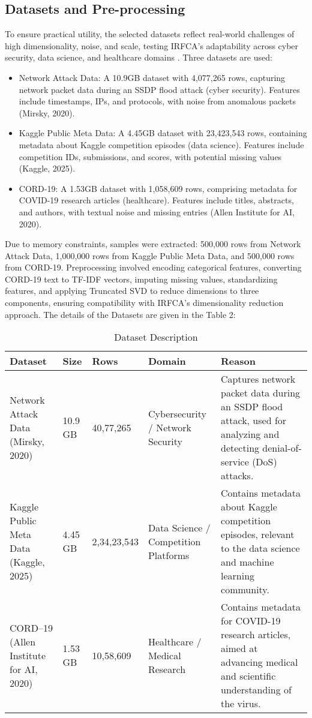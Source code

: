 \documentclass[twoside,11pt]{article}
\renewcommand{\cite}{\citep}
\begin{document}
\subsection{Datasets and Pre-processing}
To ensure practical utility, the selected datasets reflect real-world challenges of high dimensionality, noise, and scale, testing IRFCA’s adaptability across cyber security, data science, and healthcare domains \cite{jain1988,kaufman1990}. Three datasets are used:
\begin{itemize}[nosep]
    \item Network Attack Data: A 10.9GB dataset with 4,077,265 rows, capturing network packet data during an SSDP flood attack (cyber security). Features include timestamps, IPs, and protocols, with noise from anomalous packets (Mirsky, 2020).
    \item Kaggle Public Meta Data: A 4.45GB dataset with 23,423,543 rows, containing metadata about Kaggle competition episodes (data science). Features include competition IDs, submissions, and scores, with potential missing values (Kaggle, 2025).
    \item CORD-19: A 1.53GB dataset with 1,058,609 rows, comprising metadata for COVID-19 research articles (healthcare). Features include titles, abstracts, and authors, with textual noise and missing entries (Allen Institute for AI, 2020).
\end{itemize}
Due to memory constraints, samples were extracted: 500,000 rows from Network Attack Data, 1,000,000 rows from Kaggle Public Meta Data, and 500,000 rows from CORD-19. Preprocessing involved encoding categorical features, converting CORD-19 text to TF-IDF vectors, imputing missing values, standardizing features, and applying Truncated SVD to reduce dimensions to three components, ensuring compatibility with IRFCA’s dimensionality reduction approach. The details of the Datasets are given in the Table 2: 

\begin{table}[h!]
\centering
\caption{Dataset Description}
\begin{tabular}{|p{3.5cm}|p{1.5cm}|p{2cm}|p{3cm}|p{5cm}|}
\hline
\textbf{Dataset} & \textbf{Size} & \textbf{Rows} & \textbf{Domain} & \textbf{Reason} \\ \hline
Network Attack Data (Mirsky, 2020) & 10.9 GB & 40,77,265 & Cybersecurity / Network Security & Captures network packet data during an SSDP flood attack, used for analyzing and detecting denial-of-service (DoS) attacks. \\ \hline
Kaggle Public Meta Data (Kaggle, 2025) & 4.45 GB & 2,34,23,543 & Data Science / Competition Platforms & Contains metadata about Kaggle competition episodes, relevant to the data science and machine learning community. \\ \hline
CORD–19 (Allen Institute for AI, 2020) & 1.53 GB & 10,58,609 & Healthcare / Medical Research & Contains metadata for COVID-19 research articles, aimed at advancing medical and scientific understanding of the virus. \\ \hline
\end{tabular}
\end{table}
\end{document}
